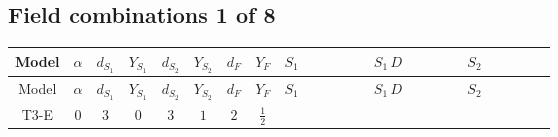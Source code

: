 \documentclass[8pt]{article}
\begin{document}
\begin{landscape}
\subsection*{Field combinations 1 of 8}
\begin{longtable}{@{}cccccccc >{\raggedright\arraybackslash}p{0.21\linewidth} >{\raggedright\arraybackslash}p{0.21\linewidth} >{\raggedright\arraybackslash}p{0.21\linewidth}@{}}
\toprule
Model & $\alpha$ & $d_{S_1}$ & $Y_{S_1}$ & $d_{S_2}$ & $Y_{S_2}$ & $d_F$ & $Y_F$ & $S_1$ & $S_1\,D$ & $S_2$ \\
\midrule
\endfirsthead
\toprule
Model & $\alpha$ & $d_{S_1}$ & $Y_{S_1}$ & $d_{S_2}$ & $Y_{S_2}$ & $d_F$ & $Y_F$ & $S_1$ & $S_1\,D$ & $S_2$ \\
\midrule
\endhead
T3-E & $0$ & $3$ & $0$ & $3$ & $1$ & $2$ & $\frac{1}{2}$ & \scriptsize\adjustbox{max width=\linewidth}{$\begin{gathered} +\frac{2 \hbar  \overline{y_{1,i_1,r_1}} \overline{y_{1,i_2,r_2}} S_{1,j_2}^2 y_{1,i_1,r_2} y_{1,i_2,r_1} \left(S_{1,j_1}{}^{\dagger }\right){}^2}{3 \epsilon } \\ -C_{S_1^\dagger S_1} S_{1,j_1} S_{1,j_1}{}^{\dagger } \\ +\frac{C_{S_1^\dagger S_1} \hbar  \overline{y_{1,i_1,r_1}} S_{1,j_1} y_{1,i_1,r_1} S_{1,j_1}{}^{\dagger }}{\sqrt{3}}\end{gathered}$} & \scriptsize\adjustbox{max width=\linewidth}{$\begin{gathered} +D_{\mu _1}\left(S_{1,j_1}\right){}^{\dagger } D_{\mu _1}\left(S_{1,j_1}\right)\end{gathered}$} & \scriptsize\adjustbox{max width=\linewidth}{$\begin{gathered} +\frac{2 \hbar  \overline{y_{2,i_1,r_1}} \overline{y_{2,i_2,r_2}} S_{2,j_2}^2 y_{2,i_1,r_2} y_{2,i_2,r_1} \left(S_{2,j_1}{}^{\dagger }\right){}^2}{3 \epsilon } \\ -C_{S_2^\dagger S_2} S_{2,j_1} S_{2,j_1}{}^{\dagger } \\ +\frac{C_{S_2^\dagger S_2} \hbar  \overline{y_{2,i_1,r_1}} S_{2,j_1} y_{2,i_1,r_1} S_{2,j_1}{}^{\dagger }}{\sqrt{3}}\end{gathered}$} \\

\end{longtable}
\end{landscape}
\end{document}
